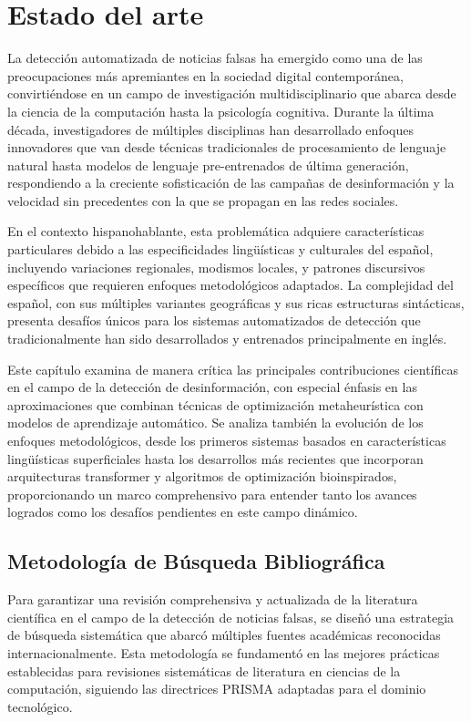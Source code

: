 \chapter{Estado del arte \label{cap:EstadoDelArte}}

La detección automatizada de noticias falsas ha emergido como una de las preocupaciones más apremiantes en la sociedad digital contemporánea, convirtiéndose en un campo de investigación multidisciplinario que abarca desde la ciencia de la computación hasta la psicología cognitiva. Durante la última década, investigadores de múltiples disciplinas han desarrollado enfoques innovadores que van desde técnicas tradicionales de procesamiento de lenguaje natural hasta modelos de lenguaje pre-entrenados de última generación, respondiendo a la creciente sofisticación de las campañas de desinformación y la velocidad sin precedentes con la que se propagan en las redes sociales.

En el contexto hispanohablante, esta problemática adquiere características particulares debido a las especificidades lingüísticas y culturales del español, incluyendo variaciones regionales, modismos locales, y patrones discursivos específicos que requieren enfoques metodológicos adaptados. La complejidad del español, con sus múltiples variantes geográficas y sus ricas estructuras sintácticas, presenta desafíos únicos para los sistemas automatizados de detección que tradicionalmente han sido desarrollados y entrenados principalmente en inglés.

Este capítulo examina de manera crítica las principales contribuciones científicas en el campo de la detección de desinformación, con especial énfasis en las aproximaciones que combinan técnicas de optimización metaheurística con modelos de aprendizaje automático. Se analiza también la evolución de los enfoques metodológicos, desde los primeros sistemas basados en características lingüísticas superficiales hasta los desarrollos más recientes que incorporan arquitecturas transformer y algoritmos de optimización bioinspirados, proporcionando un marco comprehensivo para entender tanto los avances logrados como los desafíos pendientes en este campo dinámico.

\section{Metodología de Búsqueda Bibliográfica}
\label{sec:busqueda_literatura}

Para garantizar una revisión comprehensiva y actualizada de la literatura científica en el campo de la detección de noticias falsas, se diseñó una estrategia de búsqueda sistemática que abarcó múltiples fuentes académicas reconocidas internacionalmente. Esta metodología se fundamentó en las mejores prácticas establecidas para revisiones sistemáticas de literatura en ciencias de la computación, siguiendo las directrices PRISMA adaptadas para el dominio tecnológico.

